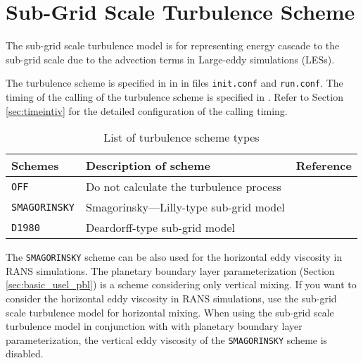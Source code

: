 
\section{Sub-Grid Scale Turbulence Scheme} \label{sec:basic_usel_turbulence}

The sub-grid scale turbulence model is for representing energy cascade to the sub-grid scale due to the advection terms in Large-eddy simulations (LESs).


The turbulence scheme is specified in  in  in files \verb|init.conf| and \verb|run.conf|. The timing of the calling of the turbulence scheme is specified in . Refer to Section \ref{sec:timeintiv} for the detailed configuration of the calling timing.

\begin{table}[h]
\begin{center}
  \caption{List of turbulence scheme types}
  \label{tab:nml_atm_tb}
  \begin{tabularx}{150mm}{lXX} \hline
    \rowcolor[gray]{0.9}  Schemes & Description of scheme & Reference\\ \hline
      \verb|OFF|          & Do not calculate the turbulence process &  \\
      \verb|SMAGORINSKY|  & Smagorinsky—Lilly-type sub-grid model & \citet{smagorinsky_1963,lilly_1962,Brown_etal_1994,Scotti_1993} \\
      \verb|D1980|        & Deardorff-type sub-grid model & \citet{Deardorff_1980} \\
    \hline
  \end{tabularx}
\end{center}
\end{table}

The \verb|SMAGORINSKY| scheme can be also used for the horizontal eddy viscosity in RANS simulations.
The planetary boundary layer parameterization (Section \ref{sec:basic_usel_pbl}) is a scheme considering only vertical mixing.
If you want to consider the horizontal eddy viscosity in RANS simulations,
use the sub-grid scale turbulence model for horizontal mixing.
When using the sub-grid scale turbulence model in conjunction with with planetary boundary layer parameterization, the vertical eddy viscosity of the \verb|SMAGORINSKY| scheme is disabled.
